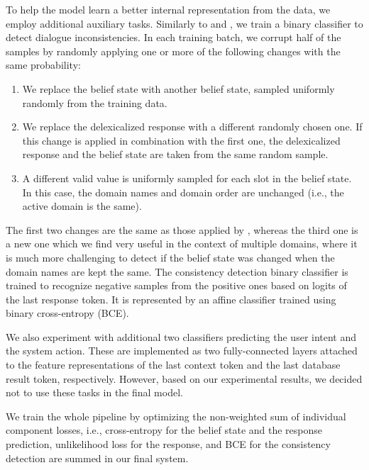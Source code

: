\documentclass[11pt,a4paper]{article}
\begin{document}
To help the model learn a better internal representation from the data, we employ additional auxiliary tasks. Similarly to \citet{devlin2019} and \citet{peng2020}, we train a binary classifier to detect dialogue inconsistencies. In each training batch, we corrupt half of the samples by randomly applying one or more of the following changes with the same probability:
\begin{enumerate}
    \item We replace the belief state  with another belief state, sampled uniformly randomly from the training data.
    \item We replace the delexicalized response  with a different randomly chosen one. If this change is applied in combination with the first one, the delexicalized response and the belief state are taken from the same random sample.
    \item A different valid value is uniformly sampled for each slot in the belief state. In this case, the domain names and domain order are unchanged (i.e., the active domain is the same).
\end{enumerate}
The first two changes are the same as those applied by \citet{peng2020}, whereas the third one is a new one which we find very useful in the context of multiple domains, where it is much more challenging to detect if the belief state was changed when the domain names are kept the same.
The consistency detection binary classifier is trained to recognize negative samples from the positive ones based on logits of the last response token. It is represented by an affine classifier trained using binary cross-entropy (BCE).

We also experiment with additional two classifiers predicting the user intent and the system action. These are implemented as two fully-connected layers attached to the feature representations of the last context token and the last database result token, respectively. 
However, based on our experimental results, we decided not to use these tasks in the final model.

We train the whole pipeline by optimizing the non-weighted sum of individual component losses, i.e., cross-entropy for the belief state and the response prediction, unlikelihood loss for the response, and BCE for the consistency detection are summed in our final system.
\end{document}
